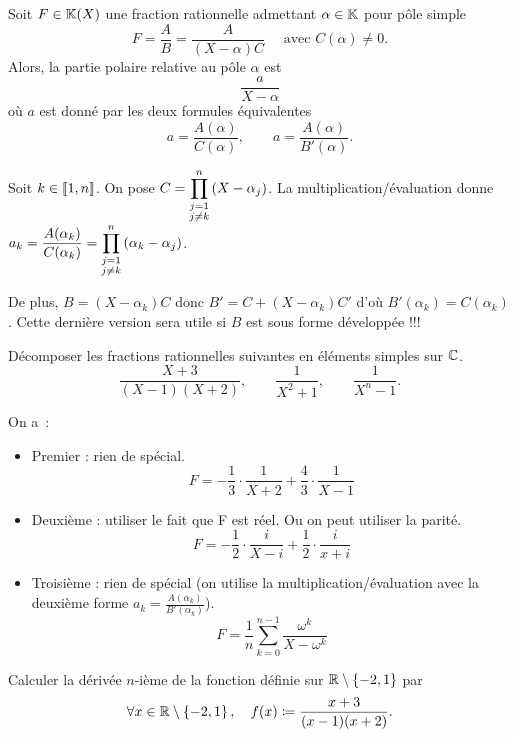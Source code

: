 \documentclass{magnolia}
\begin{document}



\begin{proposition}
Soit $F\in\fracK$ une fraction rationnelle admettant $\alpha\in\mathbb{K}$ pour pôle simple
\[F=\frac{A}{B}=\frac{A}{(X-\alpha) C} \quad \text{ avec } C(\alpha)\neq 0. \]
Alors, la partie polaire relative au pôle $\alpha$ est
\[\frac{a}{X-\alpha}\]
où $a$ est donné par les deux formules équivalentes
\[a=\frac{A(\alpha)}{C(\alpha)}, \qquad a=\frac{A(\alpha)}{B'(\alpha)}.\]
\end{proposition}

\begin{preuve}
Soit $k\in \left\llbracket 1,n\right\rrbracket$. On pose $C=\displaystyle\prod_{\substack{j=1\\j\neq k}}^n
  \left(X-\alpha_j\right)$. La multiplication/évaluation donne $a_k=\dfrac{A(\alpha_k)}{C(\alpha_k)}=\displaystyle\prod_{\substack{j=1\\j\neq k}}^n
  \left(\alpha_k-\alpha_j\right)$.
  
  De plus, $B=(X-\alpha_k)C$ donc $B'=C+(X-\alpha_k)C'$ d'où $B'(\alpha_k)=C(\alpha_k)$. Cette dernière version sera utile si $B$ est sous forme développée !!!
\end{preuve}


\begin{exos}
\exo Décomposer les fractions rationnelles suivantes en éléments simples
  sur $\mathbb{C}$.
  \[\frac{X+3}{(X-1)(X+2)}, \qquad \frac{1}{X^2+1}, \qquad \frac{1}{X^n-1}.\]
  \begin{sol}
  On a~:
  \begin{itemize}
  \item Premier : rien de spécial.
    \[F=-\frac{1}{3}\cdot\frac{1}{X+2}+\frac{4}{3}\cdot\frac{1}{X-1}\]
  \item Deuxième : utiliser le fait que F est réel. Ou on peut utiliser la parité.
    \[F=-\frac{1}{2}\cdot\frac{i}{X-i}+\frac{1}{2}\cdot\frac{i}{x+i}\]
  \item Troisième : rien de spécial (on utilise la multiplication/évaluation avec la deuxième forme $a_k=\frac{A(\alpha_k)}{B'(\alpha_k)}$).
    \[F=\frac{1}{n}\sum_{k=0}^{n-1} \frac{\omega^k}{X-\omega^k}\]
  \end{itemize}
  \end{sol}
\exo Calculer la dérivée $n$-ième de la fonction définie sur
  $\mathbb{R}\setminus\left\{-2,1\right\}$ par
  \[\forall x\in\mathbb{R}\setminus\left\{-2,1\right\} ,\quad f(x)\coloneqq\frac{x+3}{(x-1)(x+2)}.\]
\end{exos}
\end{document}
